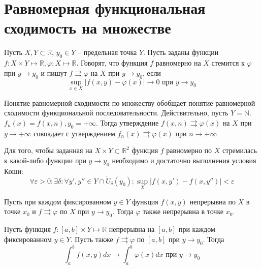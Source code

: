 \documentclass[document.tex]{subfiles}
\begin{document}
\section{Равномерная функциональная сходимость на множестве}
\begin{definition}
    Пусть $X, Y \subset \mathbb{R}$, $y_0 \in Y$ -- предельная точка $Y$. Пусть заданы функции $f : X \times Y \mapsto
    \mathbb{R}, \varphi: X \mapsto \mathbb{R}$. Говорят, что функция $f$ равномерно на $X$ стемится к $\varphi$ при $y
    \rightarrow y_0$ и пишут $f \rightrightarrows \varphi$ на $X$ при $y \rightarrow y_0$, если
    \[
        \sup_{x \in X}|f(x, y) - \varphi(x)| \rightarrow 0 \text{ при } y \rightarrow y_0
    \]
\end{definition}

\begin{remark}
    Понятие равномерной сходимости по множеству обобщает понятие равномерной сходимости функциональной
    последовательности. Действительно, пусть $Y = \mathbb{N}$. $f_n(x) = f(x, n), y_0 = +\infty$. Тогда утверждение $f(x, n)
    \rightrightarrows \varphi(x)$ на $X$ при $y \rightarrow +\infty$ совпадает с утверждением $f_n(x) \rightrightarrows
    \varphi(x)$ при $n \rightarrow +\infty$
\end{remark}

\begin{theorem}
    Для того, чтобы заданная на $X \times Y \subset \mathbb{R}^2$ функция $f$ равномерно по $X$ стремилась к какой-либо
    функции при $y \rightarrow y_0$ необходимо и достаточно выполнения условия Коши:
    \[
        \forall \varepsilon > 0: \exists \delta: \forall y', y'' \in Y \cap \mathring{U}_{\delta}(y_0):
        \sup_{X} |f(x, y') - f(x, y'')| < \varepsilon
    \]
\end{theorem}

\begin{theorem}
    Пусть при каждом фиксированном $y \in Y$ функция $f(x, y)$ непрерывна по $X$ в точке $x_0$ и $f \rightrightarrows
    \varphi$ по $X$ при $y \rightarrow y_0$. Тогда $\varphi$ также непрерывна в точке $x_0$.
\end{theorem}

\begin{theorem}
    Пусть функция $f: [a, b] \times Y \mapsto \mathbb{R}$ непрерывна на $[a, b]$ при каждом фиксированном $y \in Y$.
    Пусть также $f \rightrightarrows \varphi$ по $[a, b]$ при $y \rightarrow y_0$. Тогда
    \[
        \int_{a}^{b}f(x, y) dx \rightarrow \int_{a}^{b}\varphi(x)dx \text{ при } y \rightarrow y_0
    \]
\end{theorem}
\end{document}
